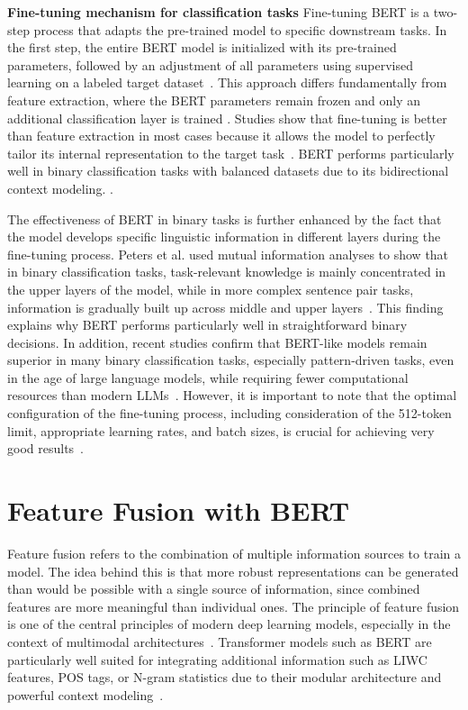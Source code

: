 \textbf{Fine-tuning mechanism for classification tasks}
Fine-tuning BERT is a two-step process that adapts the pre-trained model to specific downstream tasks. In the first step, the entire BERT model is initialized with its pre-trained parameters, followed by an adjustment of all parameters using supervised learning on a labeled target dataset~\parencite{devlin2019bert, sun2020finetuneberttextclassification}. This approach differs fundamentally from feature extraction, where the BERT parameters remain frozen and only an additional classification layer is trained \cite{peters-fintune}. Studies show that fine-tuning is better than feature extraction in most cases because it allows the model to perfectly tailor its internal representation to the target task~\parencite{peters-fintune, sun2020finetuneberttextclassification}.
BERT performs particularly well in binary classification tasks with balanced datasets due to its bidirectional context modeling. \parencite{bilal2022effectiveness}. 

The effectiveness of BERT in binary tasks is further enhanced by the fact that the model develops specific linguistic information in different layers during the fine-tuning process. Peters et al. \cite{peters-fintune} used mutual information analyses to show that in binary classification tasks, task-relevant knowledge is mainly concentrated in the upper layers of the model, while in more complex sentence pair tasks, information is gradually built up across middle and upper layers~\parencite{peters-fintune}. This finding explains why BERT performs particularly well in straightforward binary decisions.
In addition, recent studies confirm that BERT-like models remain superior in many binary classification tasks, especially pattern-driven tasks, even in the age of large language models, while requiring fewer computational resources than modern LLMs~\parencite{zhang2025bert}. However, it is important to note that the optimal configuration of the fine-tuning process, including consideration of the 512-token limit, appropriate learning rates, and batch sizes, is crucial for achieving very good results~\parencite{sun2020finetuneberttextclassification, bilal2022effectiveness}.



\section{Feature Fusion with BERT}

Feature fusion refers to the combination of multiple information sources to train a model. The idea behind this is that more robust representations can be generated than would be possible with a single source of information, since combined features are more meaningful than individual ones. The principle of feature fusion is one of the central principles of modern deep learning models, especially in the context of multimodal architectures~\parencite{li2024multimodal}. 
Transformer models such as BERT are particularly well suited for integrating additional information such as LIWC features, POS tags, or N-gram statistics due to their modular architecture and powerful context modeling~\parencite{nagrani2021attention}.

